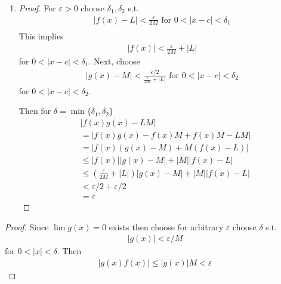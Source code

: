\begin{enumerate}[label=(\alph*)]
\begin{enumerate}
        \item 
        \begin{proof}
            For $\varepsilon>0$ choose $\delta_1, \delta_2$ s.t. 
            \begin{gather*}
                |f(x)-L| < \frac{\varepsilon}{2M} \text{ for } 0<|x-c|<\delta_1 \\
            \end{gather*}
            This implies
            \begin{align*}
                |f(x)| < \frac{\varepsilon}{2M} + |L|
            \end{align*}
            for $0<|x-c|<\delta_1$.
            Next, choose
            \begin{align*}
                |g(x)-M| < \frac{\varepsilon/2}{\frac{\varepsilon}{2M} + |L|} \text{ for } 0<|x-c|<\delta_2
            \end{align*}
            for $0<|x-c|<\delta_2$.

            Then for $\delta = \min\{\delta_1, \delta_2\}$
            \begin{align*}
                &|f(x)g(x)- LM| \\
                &= |f(x)g(x) -f(x)M + f(x)M- LM| \\
                            &= |f(x)(g(x) - M) + M(f(x)- L)| \\
                            &\leq |f(x)||g(x) - M| + |M||f(x)- L| \\
                            &\leq (\frac{\varepsilon}{2M} + |L|)|g(x) - M| + |M||f(x)- L| \\
                            &< \varepsilon/2 + \varepsilon/2 \\
                            &= \varepsilon
            \end{align*}
        \end{proof}
    \end{enumerate}
\end{enumerate}

\begin{proof}
    Since $\lim g(x) = 0$ exists then choose for arbitrary $\varepsilon$
    choose $\delta$ s.t. 
    \begin{align*}
        |g(x)| < \varepsilon/M
    \end{align*} 
    for $0<|x|<\delta$. Then
    \begin{align*}
        |g(x)f(x)| \leq |g(x)|M < \varepsilon 
    \end{align*}
\end{proof}

